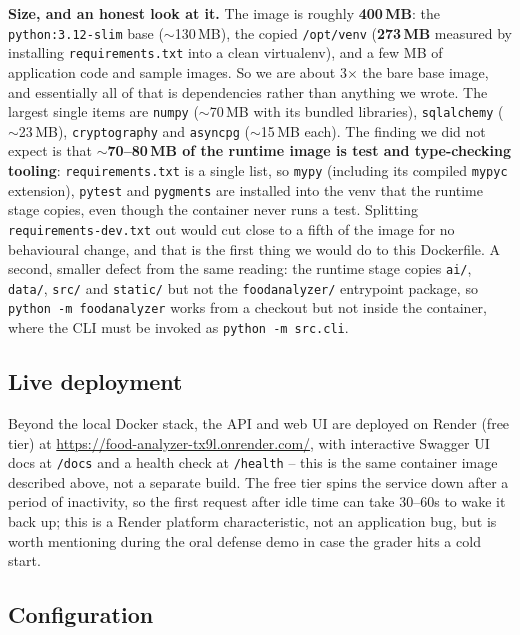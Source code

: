 \documentclass[11pt,a4paper]{article}
\begin{document}
\par\noindent
\textbf{Size, and an honest look at it.} The image is roughly
\textbf{400\,MB}: the \texttt{python:3.12-slim} base ($\sim$130\,MB), the
copied \texttt{/opt/venv} (\textbf{273\,MB} measured by installing
\texttt{requirements.txt} into a clean virtualenv), and a few MB of
application code and sample images. So we are about 3$\times$ the bare
base image, and essentially all of that is dependencies rather than
anything we wrote. The largest single items are \texttt{numpy}
($\sim$70\,MB with its bundled libraries), \texttt{sqlalchemy}
($\sim$23\,MB), \texttt{cryptography} and \texttt{asyncpg}
($\sim$15\,MB each). The finding we did not expect is that
\textbf{$\sim$70--80\,MB of the runtime image is test and type-checking
tooling}: \texttt{requirements.txt} is a single list, so \texttt{mypy}
(including its compiled \texttt{mypyc} extension), \texttt{pytest} and
\texttt{pygments} are installed into the venv that the runtime stage
copies, even though the container never runs a test. Splitting
\texttt{requirements-dev.txt} out would cut close to a fifth of the image
for no behavioural change, and that is the first thing we would do to this
Dockerfile. A second, smaller defect from the same reading: the runtime
stage copies \texttt{ai/}, \texttt{data/}, \texttt{src/} and
\texttt{static/} but not the \texttt{foodanalyzer/} entrypoint package, so
\texttt{python -m foodanalyzer} works from a checkout but not inside the
container, where the CLI must be invoked as \texttt{python -m src.cli}.

\subsection{Live deployment}

\par\noindent
Beyond the local Docker stack, the API and web UI are deployed on Render
(free tier) at \url{https://food-analyzer-tx9l.onrender.com/}, with
interactive Swagger UI docs at \texttt{/docs} and a health check at
\texttt{/health} -- this is the same container image described above, not
a separate build. The free tier spins the service down after a period of
inactivity, so the first request after idle time can take 30--60s to wake
it back up; this is a Render platform characteristic, not an application
bug, but is worth mentioning during the oral defense demo in case the
grader hits a cold start.

\subsection{Configuration}
\end{document}
